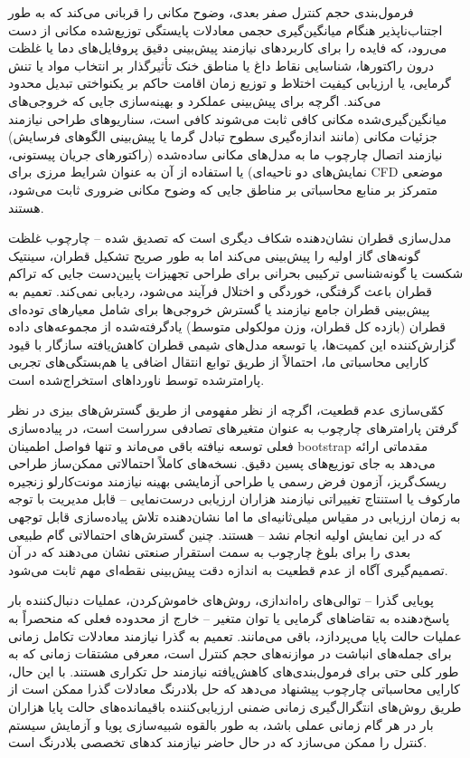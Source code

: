\documentclass[12pt, a4paper]{article}
\begin{document}
فرمول‌بندی حجم کنترل صفر بعدی، وضوح مکانی را قربانی می‌کند که به طور اجتناب‌ناپذیر هنگام میانگین‌گیری حجمی معادلات پایستگی توزیع‌شده مکانی از دست می‌رود، که فایده را برای کاربردهای نیازمند پیش‌بینی دقیق پروفایل‌های دما یا غلظت درون راکتورها، شناسایی نقاط داغ یا مناطق خنک تأثیرگذار بر انتخاب مواد یا تنش گرمایی، یا ارزیابی کیفیت اختلاط و توزیع زمان اقامت حاکم بر یکنواختی تبدیل محدود می‌کند. اگرچه برای پیش‌بینی عملکرد و بهینه‌سازی جایی که خروجی‌های میانگین‌گیری‌شده مکانی کافی ثابت می‌شوند کافی است، سناریوهای طراحی نیازمند جزئیات مکانی (مانند اندازه‌گیری سطوح تبادل گرما یا پیش‌بینی الگوهای فرسایش) نیازمند اتصال چارچوب ما به مدل‌های مکانی ساده‌شده (راکتورهای جریان پیستونی، نمایش‌های دو ناحیه‌ای) یا استفاده از آن به عنوان شرایط مرزی برای CFD موضعی متمرکز بر منابع محاسباتی بر مناطق جایی که وضوح مکانی ضروری ثابت می‌شود، هستند.

مدل‌سازی قطران نشان‌دهنده شکاف دیگری است که تصدیق شده – چارچوب غلظت گونه‌های گاز اولیه را پیش‌بینی می‌کند اما به طور صریح تشکیل قطران، سینتیک شکست یا گونه‌شناسی ترکیبی بحرانی برای طراحی تجهیزات پایین‌دست جایی که تراکم قطران باعث گرفتگی، خوردگی و اختلال فرآیند می‌شود، ردیابی نمی‌کند. تعمیم به پیش‌بینی قطران جامع نیازمند یا گسترش خروجی‌ها برای شامل معیارهای توده‌ای قطران (بازده کل قطران، وزن مولکولی متوسط) یادگرفته‌شده از مجموعه‌های داده گزارش‌کننده این کمیت‌ها، یا توسعه مدل‌های شیمی قطران کاهش‌یافته سازگار با قیود کارایی محاسباتی ما، احتمالاً از طریق توابع انتقال اضافی یا هم‌بستگی‌های تجربی پارامترشده توسط ناورداهای استخراج‌شده است.

کمّی‌سازی عدم قطعیت، اگرچه از نظر مفهومی از طریق گسترش‌های بیزی در نظر گرفتن پارامترهای چارچوب به عنوان متغیرهای تصادفی سرراست است، در پیاده‌سازی فعلی توسعه نیافته باقی می‌ماند و تنها فواصل اطمینان bootstrap مقدماتی ارائه می‌دهد به جای توزیع‌های پسین دقیق. نسخه‌های کاملاً احتمالاتی ممکن‌ساز طراحی ریسک‌گریز، آزمون فرض رسمی یا طراحی آزمایشی بهینه نیازمند مونت‌کارلو زنجیره مارکوف یا استنتاج تغییراتی نیازمند هزاران ارزیابی درست‌نمایی – قابل مدیریت با توجه به زمان ارزیابی در مقیاس میلی‌ثانیه‌ای ما اما نشان‌دهنده تلاش پیاده‌سازی قابل توجهی که در این نمایش اولیه انجام نشد – هستند. چنین گسترش‌های احتمالاتی گام طبیعی بعدی را برای بلوغ چارچوب به سمت استقرار صنعتی نشان می‌دهند که در آن تصمیم‌گیری آگاه از عدم قطعیت به اندازه دقت پیش‌بینی نقطه‌ای مهم ثابت می‌شود.

پویایی گذرا – توالی‌های راه‌اندازی، روش‌های خاموش‌کردن، عملیات دنبال‌کننده بار پاسخ‌دهنده به تقاضاهای گرمایی یا توان متغیر – خارج از محدوده فعلی که منحصراً به عملیات حالت پایا می‌پردازد، باقی می‌مانند. تعمیم به گذرا نیازمند معادلات تکامل زمانی برای جمله‌های انباشت در موازنه‌های حجم کنترل است، معرفی مشتقات زمانی که به طور کلی حتی برای فرمول‌بندی‌های کاهش‌یافته نیازمند حل تکراری هستند. با این حال، کارایی محاسباتی چارچوب پیشنهاد می‌دهد که حل بلادرنگ معادلات گذرا ممکن است از طریق روش‌های انتگرال‌گیری زمانی ضمنی ارزیابی‌کننده باقیمانده‌های حالت پایا هزاران بار در هر گام زمانی عملی باشد، به طور بالقوه شبیه‌سازی پویا و آزمایش سیستم کنترل را ممکن می‌سازد که در حال حاضر نیازمند کدهای تخصصی بلادرنگ است.
\end{document}
